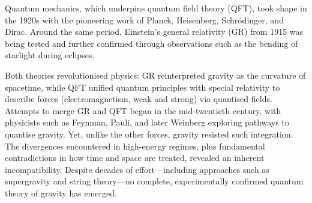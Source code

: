 

\begin{historical}
Quantum mechanics, which underpins quantum field theory (QFT), took shape in the 1920s with the pioneering work of Planck, Heisenberg, Schrödinger, and Dirac. Around the same period, Einstein’s general relativity (GR) from 1915 was being tested and further confirmed through observations such as the bending of starlight during eclipses. 

Both theories revolutionised physics: GR reinterpreted gravity as the curvature of spacetime, while QFT unified quantum principles with special relativity to describe forces (electromagnetism, weak and strong) via quantised fields. Attempts to merge GR and QFT began in the mid-twentieth century, with physicists such as Feynman, Pauli, and later Weinberg exploring pathways to quantise gravity. Yet, unlike the other forces, gravity resisted such integration. The divergences encountered in high-energy regimes, plus fundamental contradictions in how time and space are treated, revealed an inherent incompatibility. Despite decades of effort—including approaches such as supergravity and string theory—no complete, experimentally confirmed quantum theory of gravity has emerged. 
\end{historical}
